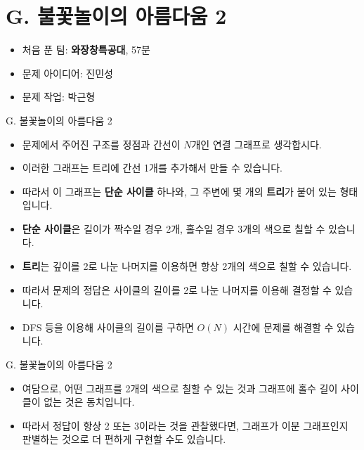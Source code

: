 \def\probno{G}
\def\probtitle{불꽃놀이의 아름다움 2}

\section{\probno{}. \probtitle{}}

\begin{frame} %
    \sectiontitle{\probno{}}{\probtitle{}}
    \begin{itemize}
        \item 처음 푼 팀: \textbf{와장창특공대}, 57분
        \item 문제 아이디어: 진민성
        \item 문제 작업: 박근형
    \end{itemize}
\end{frame}

\begin{frame}{\probno{}. \probtitle{}}
    \begin{itemize}
        \item 문제에서 주어진 구조를 정점과 간선이 $N$개인 연결 그래프로 생각합시다.
        \item 이러한 그래프는 트리에 간선 1개를 추가해서 만들 수 있습니다.
        \item 따라서 이 그래프는 \textbf{단순 사이클} 하나와, 그 주변에 몇 개의 \textbf{트리}가 붙어 있는 형태입니다.
        \vspace{3mm}
        \item \textbf{단순 사이클}은 길이가 짝수일 경우 2개, 홀수일 경우 3개의 색으로 칠할 수 있습니다.
        \item \textbf{트리}는 깊이를 2로 나눈 나머지를 이용하면 항상 2개의 색으로 칠할 수 있습니다.
        \item 따라서 문제의 정답은 사이클의 길이를 2로 나눈 나머지를 이용해 결정할 수 있습니다.
        \item DFS 등을 이용해 사이클의 길이를 구하면 $O(N)$ 시간에 문제를 해결할 수 있습니다.
    \end{itemize}
\end{frame}

\begin{frame}{\probno{}. \probtitle{}}
    \begin{itemize}
        \item 여담으로, 어떤 그래프를 2개의 색으로 칠할 수 있는 것과 그래프에 홀수 길이 사이클이 없는 것은 동치입니다.
        \item 따라서 정답이 항상 2 또는 3이라는 것을 관찰했다면, 그래프가 이분 그래프인지 판별하는 것으로 더 편하게 구현할 수도 있습니다.
    \end{itemize}
\end{frame}
